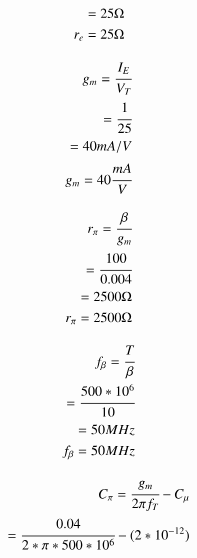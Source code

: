 \begin{enumerate}[label=\thesubsection.\arabic*.,ref=\thesubsection.\theenumi]
\begin{align}
              = 25 \ohm\\
              
        r_{e} = 25 \ohm
                   
\end{align}

\begin{align}
    
       g_{m} = \cfrac{I_{E}}{V_{T}}\\
             
             = \cfrac{1}{25}\\
             
             =  40 mA/V\\
        
        g_{m}=  40 \cfrac{mA}{V}
        
\end{align}

\begin{align}
          
        r_{\pi} = \cfrac{\beta}{g_{m}}\\
                
                = \cfrac{100}{0.004}\\
                
                = 2500 \ohm\\
            
         r_{\pi} = 2500 \ohm
  
\end{align}

\begin{align}

        f_{\beta} = \cfrac{{T}}{\beta}\\
                  
                  = \cfrac{500*{10^6}}{10}\\
                  
                  = 50 MHz\\

       f_{\beta} = 50 MHz
\end{align}

\begin{align}

        C_{\pi} = \cfrac{g_{m}}{2\pi f_{T}}- C_{\mu}\\
              
                = \cfrac{0.04}{2*\pi*500*{10^6}}- (2*{10^{-12}})\\
              

\end{align}
\end{enumerate}
